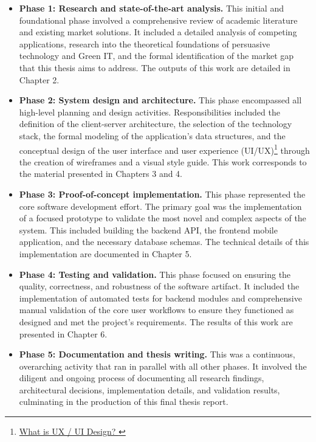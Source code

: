 \begin{itemize}
\item \textbf{Phase 1: Research and state-of-the-art analysis.} This initial and foundational phase involved a comprehensive review of academic literature and existing market solutions. It included a detailed analysis of competing applications, research into the theoretical foundations of persuasive technology and Green IT, and the formal identification of the market gap that this thesis aims to address. The outputs of this work are detailed in Chapter 2.
\textgap
\item \textbf{Phase 2: System design and architecture.} This phase encompassed all high-level planning and design activities. Responsibilities included the definition of the client-server architecture, the selection of the technology stack, the formal modeling of the application's data structures, and the conceptual design of the user interface and user experience (UI/UX)\footnote{\href{https://flatironschool.com/blog/what-is-ux-ui-design/}{What is UX / UI Design? }} through the creation of wireframes and a visual style guide. This work corresponds to the material presented in Chapters 3 and 4.
\textgap
\item \textbf{Phase 3: Proof-of-concept implementation.} This phase represented the core software development effort. The primary goal was the implementation of a focused prototype to validate the most novel and complex aspects of the system. This included building the backend API, the frontend mobile application, and the necessary database schemas. The technical details of this implementation are documented in Chapter 5.
\textgap
\item \textbf{Phase 4: Testing and validation.} This phase focused on ensuring the quality, correctness, and robustness of the software artifact. It included the implementation of automated tests for backend modules and comprehensive manual validation of the core user workflows to ensure they functioned as designed and met the project's requirements. The results of this work are presented in Chapter 6.
\textgap
\item \textbf{Phase 5: Documentation and thesis writing.} This was a continuous, overarching activity that ran in parallel with all other phases. It involved the diligent and ongoing process of documenting all research findings, architectural decisions, implementation details, and validation results, culminating in the production of this final thesis report.
\end{itemize}

